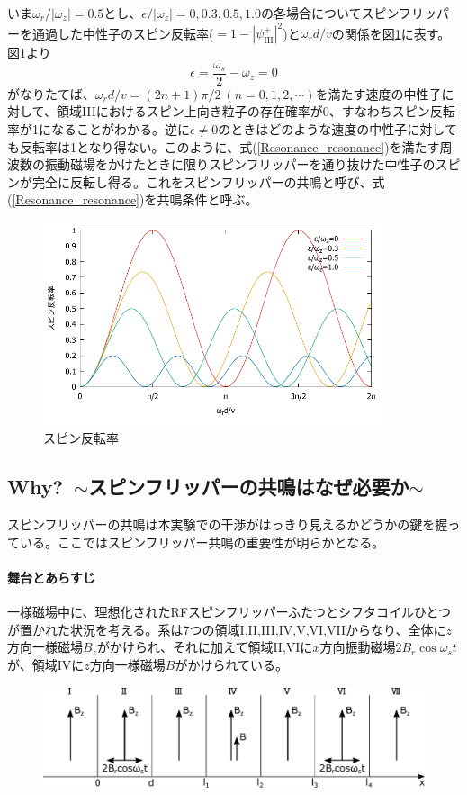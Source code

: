 いま$\omega_r/|\omega_z|=0.5$とし、$\epsilon/|\omega_z|=0,0.3,0.5,1.0$の各場合についてスピンフリッパーを通過した中性子のスピン反転率($=1-|\psi_\mathrm{III}^+|^2$)と$\omega_r d/v$の関係を図\ref{Resonance_fig_reversalrate}に表す。
図\ref{Resonance_fig_reversalrate}より
\begin{equation}
\epsilon=\frac{\omega_s}{2}-\omega_z=0 \label{Resonance_resonance}
\end{equation}
がなりたてば、$\omega_r d/v =(2n+1)\pi/2 \ (n =0,1,2,\cdots)$を満たす速度の中性子に対して、領域IIIにおけるスピン上向き粒子の存在確率が0、すなわちスピン反転率が1になることがわかる。逆に$\epsilon \neq 0$のときはどのような速度の中性子に対しても反転率は1となり得ない。このように、式(\ref{Resonance_resonance})を満たす周波数の振動磁場をかけたときに限りスピンフリッパーを通り抜けた中性子のスピンが完全に反転し得る。これをスピンフリッパーの共鳴と呼び、式(\ref{Resonance_resonance})を共鳴条件と呼ぶ。
\begin{figure}[h]
\begin{center}
\includegraphics[width=10cm]{resonance/whatwhyhow/resonance_reversalrate.pdf}
\caption{スピン反転率}
\label{Resonance_fig_reversalrate}
\end{center}
\end{figure}

\subsection{Why?\ $\sim$スピンフリッパーの共鳴はなぜ必要か$\sim$}
スピンフリッパーの共鳴は本実験での干渉がはっきり見えるかどうかの鍵を握っている。ここではスピンフリッパー共鳴の重要性が明らかとなる。

\paragraph{舞台とあらすじ}
一様磁場中に、理想化されたRFスピンフリッパーふたつとシフタコイルひとつが置かれた状況を考える。系は7つの領域I,II,III,IV,V,VI,VIIからなり、全体に$z$方向一様磁場$B_z$がかけられ、それに加えて領域II,VIに$x$方向振動磁場$2B_r\cos\omega_s t$が、領域IVに$z$方向一様磁場$B$がかけられている。
\begin{figure}[h]
\centering
\includegraphics[height=3cm]{resonance/whatwhyhow/Resonance_why_setting.pdf}
\end{figure}

